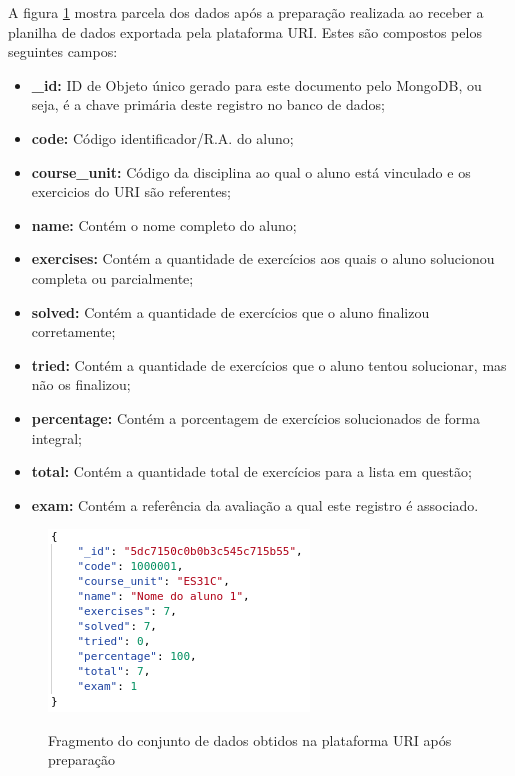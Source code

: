 A figura \ref{fig:dados-uri-pos} mostra parcela dos dados após a preparação realizada ao receber a planilha de dados exportada pela plataforma URI.
Estes são compostos pelos seguintes campos:

\begin{itemize}[topsep=5pt]
    \item \textbf{\_id:} ID de Objeto único gerado para este documento pelo MongoDB, ou seja, é a chave primária deste registro no banco de dados;
    \item \textbf{code:} Código identificador/R.A. do aluno; 
    \item \textbf{course\_unit:} Código da disciplina ao qual o aluno está vinculado e os exercicios do URI são referentes; 
    \item \textbf{name:} Contém o nome completo do aluno;
    \item \textbf{exercises:} Contém a quantidade de exercícios aos quais o aluno solucionou completa ou parcialmente;
    \item \textbf{solved:} Contém a quantidade de exercícios que o aluno finalizou corretamente;
    \item \textbf{tried:} Contém a quantidade de exercícios que o aluno tentou solucionar, mas não os finalizou;
    \item \textbf{percentage:} Contém a porcentagem de exercícios solucionados de forma integral;
    \item \textbf{total:} Contém a quantidade total de exercícios para a lista em questão;
    \item \textbf{exam:} Contém a referência da avaliação a qual este registro é associado.
\end{itemize}

\begin{figure}[!htb]
    \centering
    \caption{Fragmento do conjunto de dados obtidos na plataforma URI após preparação}
    \includegraphics[height=0.32\textwidth]{./dados/figuras/dados-uri-pos}
    \label{fig:dados-uri-pos}
\end{figure}

